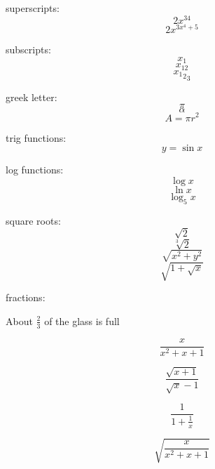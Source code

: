 \documentclass[11pt]{article}
\begin{document}
superscripts:
$$2x^{34}$$ 
$$2x^{3x^4+5}$$

subscripts:
$$x_1$$
$$x_{12}$$
$${{x_1}_2}_3$$

greek letter:
$$\pi$$
$$\alpha$$
$$A=\pi r^2$$ 

trig functions:
$$y=\sin{x}$$

log functions:
$$\log{x}$$
$$\ln{x}$$
$$\log_5{x}$$

square roots:
$$\sqrt{2}$$
$$\sqrt[3]{2}$$
$$\sqrt{x^2+y^2}$$
$$\sqrt{1+\sqrt{x}}$$

fractions:

About $\frac{2}{3}$ of the glass is full

$$\frac{x}{x^2+x+1}$$

$$\frac{\sqrt{x+1}}{\sqrt{x}-1}$$

$$\frac{1}{1+\frac{1}{x}}$$

$$\sqrt{\frac{x}{x^2+x+1}}$$
\end{document}

